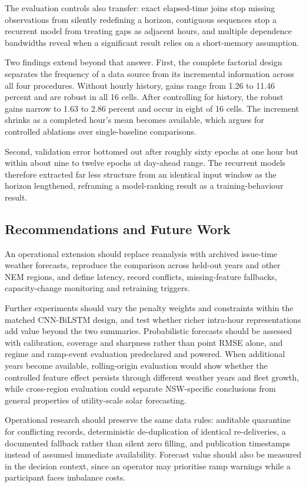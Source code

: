 The evaluation controls also transfer: exact elapsed-time joins stop missing observations from silently redefining a horizon, contiguous sequences stop a recurrent model from treating gaps as adjacent hours, and multiple dependence bandwidths reveal when a significant result relies on a short-memory assumption.

Two findings extend beyond that answer. First, the complete factorial design separates the frequency of a data source from its incremental information across all four procedures. Without hourly history, gains range from 1.26 to 11.46 percent and are robust in all 16 cells. After controlling for history, the robust gains narrow to 1.63 to 2.86 percent and occur in eight of 16 cells. The increment shrinks as a completed hour's mean becomes available, which argues for controlled ablations over single-baseline comparisons.

Second, validation error bottomed out after roughly sixty epochs at one hour but within about nine to twelve epochs at day-ahead range. The recurrent models therefore extracted far less structure from an identical input window as the horizon lengthened, reframing a model-ranking result as a training-behaviour result.

\subsection{Recommendations and Future Work}

An operational extension should replace reanalysis with archived issue-time weather forecasts, reproduce the comparison across held-out years and other NEM regions, and define latency, record conflicts, missing-feature fallbacks, capacity-change monitoring and retraining triggers.

Further experiments should vary the penalty weights and constraints within the matched CNN-\allowbreak{}BiLSTM design, and test whether richer intra-hour representations add value beyond the two summaries. Probabilistic forecasts should be assessed with calibration, coverage and sharpness rather than point RMSE alone, and regime and ramp-event evaluation predeclared and powered. When additional years become available, rolling-origin evaluation would show whether the controlled feature effect persists through different weather years and fleet growth, while cross-region evaluation could separate NSW-specific conclusions from general properties of utility-scale solar forecasting.

Operational research should preserve the same data rules: auditable quarantine for conflicting records, deterministic de-duplication of identical re-deliveries, a documented fallback rather than silent zero filling, and publication timestamps instead of assumed immediate availability. Forecast value should also be measured in the decision context, since an operator may prioritise ramp warnings while a participant faces imbalance costs.

